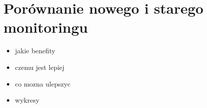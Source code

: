 \section{Porównanie nowego i starego monitoringu}
\begin{itemize}
\item jakie benefity
\item czemu jest lepiej
\item co mozna ulepszyc
\item wykresy
\end{itemize}
